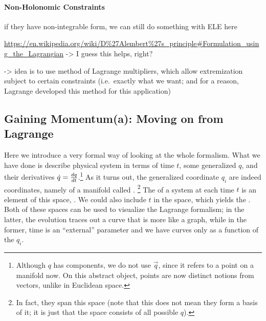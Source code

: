 \documentclass[../class_mech_main.tex]{subfiles}
\begin{document}
			\paragraph{Non-Holonomic Constraints}
if they have non-integrable form, we can still do something with ELE here


\url{https://en.wikipedia.org/wiki/D%27Alembert%27s_principle#Formulation_using_the_Lagrangian} -> I guess this helps, right?

-> idea is to use method of Lagrange multipliers, which allow extremization subject to certain constraints (i.e.~exactly what we want; and for a reason, Lagrange developed this method for this application)





		\subsection{Gaining Momentum(a): Moving on from Lagrange}

Here we introduce a very formal way of looking at the whole formalism. What we have done is describe physical system in terms of time $t$, some generalized  $q$, and their derivatives $\dot{q} = \dv{q}{t}$.\footnote{Although $q$ has components, we do not use $\vec{q}$, since it refers to a point on a manifold now. On this abstract object, points are now distinct notions from vectors, unlike in Euclidean space.}
As it turns out, the generalized coordinate $q_i$ are indeed coordinates, namely of a manifold called .%
\footnote{In fact, they span this space (note that this does not mean they form a basis of it; it is just that the space consists of all possible $q$). }
The  of a system at each time $t$ is an element of this space, . We could also include $t$ in the space, which yields the . Both of these spaces can be used to visualize the Lagrange formalism; in the latter, the evolution traces out a curve that is more like a graph, while in the former, time is an \enquote{external} parameter and we have curves only as a function of the $q_i$.
\end{document}
